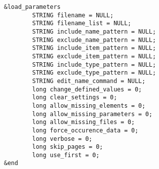 \documentclass[11pt]{article}
\begin{document}
\begin{verbatim}
&load_parameters
        STRING filename = NULL;
        STRING filename_list = NULL;
        STRING include_name_pattern = NULL;
        STRING exclude_name_pattern = NULL;
        STRING include_item_pattern = NULL;
        STRING exclude_item_pattern = NULL;
        STRING include_type_pattern = NULL;
        STRING exclude_type_pattern = NULL;
        STRING edit_name_command = NULL;
        long change_defined_values = 0;
        long clear_settings = 0;
        long allow_missing_elements = 0;
        long allow_missing_parameters = 0;
        long allow_missing_files = 0;
        long force_occurence_data = 0;
        long verbose = 0;
        long skip_pages = 0;
        long use_first = 0;
&end
\end{verbatim}
\end{document}
